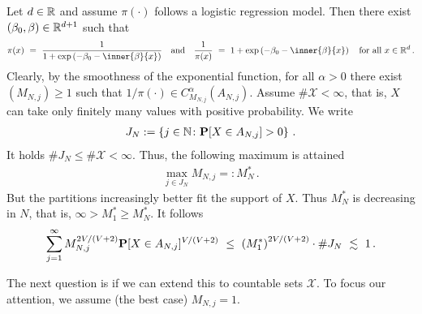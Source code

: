 \begin{example}
Let $d\in\R$ and assume $\pi(\cdot)$ follows a logistic regression model. Then there exist $(\beta_0,\beta)\in\R^{d+1}$ such that
\begin{gather*}
  \pi(x)
  \ 
  =
  \ 
  \frac{1}
  {
    1
    +
    \exp
    \left( 
      -
        \beta_0
        -
        \inner{\beta}{x}
    \right)
  }
  \quad
  \text{and}
  \quad
  \frac
  {1}
  {
  \pi(x)
  }
  \ 
  =
  \ 
    1
    +
    \exp
    \left( 
      -
        \beta_0
        -
        \inner{\beta}{x}
    \right)
    \quad
    \text{for all}\ 
    x\in\R^d
    \,.
\end{gather*}
Clearly, by the smoothness of the exponential function, for all 
$\alpha>0$ there exist $(M_{N,j})\ge 1$ such that
$
  1/\pi(\cdot)\in C^\alpha_{M_{N,j}}(A_{N,j})
$.
Assume $\#\mathcal{X}<\infty$, that is, $X$ can take only finitely many values with positive probability.
We write
\begin{gather*}
  J_N
  :=
  \left\{ 
    j\in\mathbb{N}
    \colon
    \P[X\in A_{N,j}]>0
  \right\}
  \,.
\end{gather*}
It holds
$\#J_N\le \# \mathcal{X}<\infty$.
Thus, the following maximum is attained
\begin{gather*}
  \max_{j\in J_N} M_{N,j}
  =:M^*_N
  \,.
\end{gather*}
But the partitions increasingly better fit the support of $X$. Thus
$M^*_N$ is decreasing in $N$, that is,  $\infty>M^*_1\ge M^*_N$.
It follows
\begin{align*}
  \sum_{j=1}^{\infty} 
  M_{N,j}
  ^{2V/(V+2)}
  \P
  [
  X\in A_{N,j}
  ]^{V/(V+2)}
  \ 
  \le
  \ 
  \left( 
  M^*_1
  \right)
  ^{2V/(V+2)}
  \cdot
  \# J_N
  \ 
  \lesssim
  \ 
  1
  \,.
\end{align*}
\end{example}
The next question is if we can extend this to countable sets
$\mathcal{X}$. To focus our attention, we assume (the best case)
$M_{N,j}=1$.
